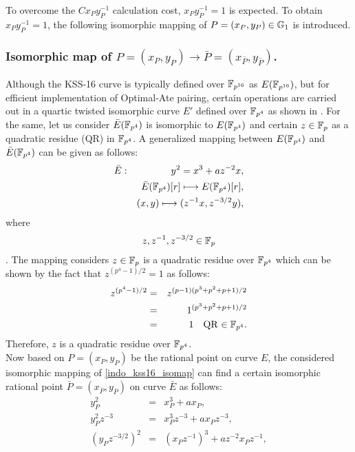 To overcome the $Cx_{P}y_{P}^{-1}$  calculation cost, $x_{P}y_{P}^{-1} =1 $ is expected. 
To obtain $x_{P}y_{P}^{-1} = 1$, the following isomorphic mapping of $P=(x_P,y_P) \in {\mathbb{G}}_{1}$ is introduced. 


\subsubsection{Isomorphic map of \texorpdfstring{$P=(x_P,y_P) \to \bar P=(x_{\bar P},y_{\bar P})$}{}.}
Although the KSS-16 curve is typically defined over $\mathbb{F}_{p^{16}}$ as $E(\mathbb{F}_{p^{16}})$, but for efficient implementation of Optimal-Ate pairing, certain operations are carried out in a quartic twisted isomorphic curve $E'$ defined over $\mathbb{F}_{p^4}$ as shown in . 
For the same, let us consider $\bar{E}(\mathbb{F}_{p^4})$ is isomorphic to $E(\mathbb{F}_{p^4})$ and certain $z \in {\mathbb{F}}_{p}$ as a quadratic residue (QR) in $\mathbb{F}_{p^4}$. 
A generalized mapping between $E(\mathbb{F}_{p^4})$ and $\bar{E}(\mathbb{F}_{p^4})$ can be given as follows:
\begin{eqnarray}
\bar{E}&:&y^2=x^3+az^{-2}x,\nonumber\\
&&\bar{E}(\mathbb{F}_{p^4})[r]\longmapsto E(\mathbb{F}_{p^4})[r],\nonumber\\
&&(x,y)\longmapsto (z^{-1}x,z^{-3/2}y),\label{indo_kss16_isomap}\nonumber\\
\end{eqnarray}
where $$z, z^{-1},z^{-3/2}\in {\mathbb{F}}_{p}$$.
The mapping considers $z \in {\mathbb{F}}_{p}$ is a quadratic residue over $\mathbb{F}_{p^4}$ which can be shown by the fact that $z^{(p^4-1)/2} = 1$ as follows:
\begin{eqnarray}
z^{(p^4-1)/2}& = &z^{(p-1)(p^3+p^2+p+1)/2 } \nonumber \\
& = &1^{(p^3+p^2+p+1)/2 } \nonumber \\
& = & 1 \quad \text{QR $\in \mathbb{F}_{p^4}$}.
\end{eqnarray}
Therefore, $z$ is a quadratic residue over $\mathbb{F}_{p^4}$.\\
Now  based on $P= (x_P, y_P)$ be the rational point on curve $E$, the considered isomorphic mapping of \eqref{indo_kss16_isomap}  can find a certain isomorphic rational point $\bar P = (x_{\bar P}, y_{\bar P})$ on curve $\bar E$ as follows:
\begin{eqnarray}\label{eq:indo_kss16_bar_P}
y_P^2 & = & x_P^3+ax_P, \nonumber \\
y_P^2 z^{-3}& = & x_P^3 z^{-3} +ax_Pz^{-3}, \nonumber \\
(y_P z^{-3/2})^2& = & (x_Pz^{-1})^3 +az^{-2} x_Pz^{-1},
\end{eqnarray}
